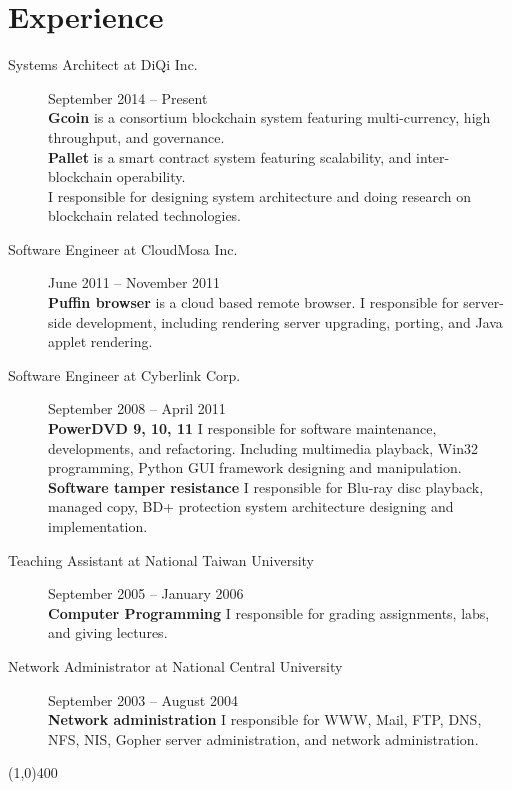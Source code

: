 \documentclass[10pt,a4paper]{article}
\newcommand{\hr}{\noindent\line(1,0){400}}
\newcommand{\br}{\hfill\\}
\begin{document}
\section*{Experience}
\begin{description}
\item[Systems Architect at DiQi Inc.]
September 2014 -- Present\br
\textbf{Gcoin} is a consortium blockchain system featuring multi-currency, high throughput, and governance.\br
\textbf{Pallet} is a smart contract system featuring scalability, and inter-blockchain operability.\br
I responsible for designing system architecture and doing research on blockchain related technologies.

\item[Software Engineer at CloudMosa Inc.]
June 2011 -- November 2011\br
\textbf{Puffin browser} is a cloud based remote browser.
I responsible for server-side development, including rendering server upgrading, porting, and Java applet rendering.

\item[Software Engineer at Cyberlink Corp.]
September 2008 -- April 2011\br
\textbf{PowerDVD 9, 10, 11} I responsible for software maintenance, developments, and refactoring.
Including multimedia playback, Win32 programming, Python GUI framework designing and manipulation.\br
\textbf{Software tamper resistance} I responsible for Blu-ray disc playback, managed copy, BD+ protection system architecture designing and implementation.

\item[Teaching Assistant at National Taiwan University]
September 2005 -- January 2006\br
\textbf{Computer Programming} I responsible for grading assignments, labs, and giving lectures.

\item[Network Administrator at National Central University]
September 2003 -- August 2004\br
\textbf{Network administration} I responsible for WWW, Mail, FTP, DNS, NFS, NIS, Gopher server administration, and network administration.
\end{description}

\hr
\end{document}
